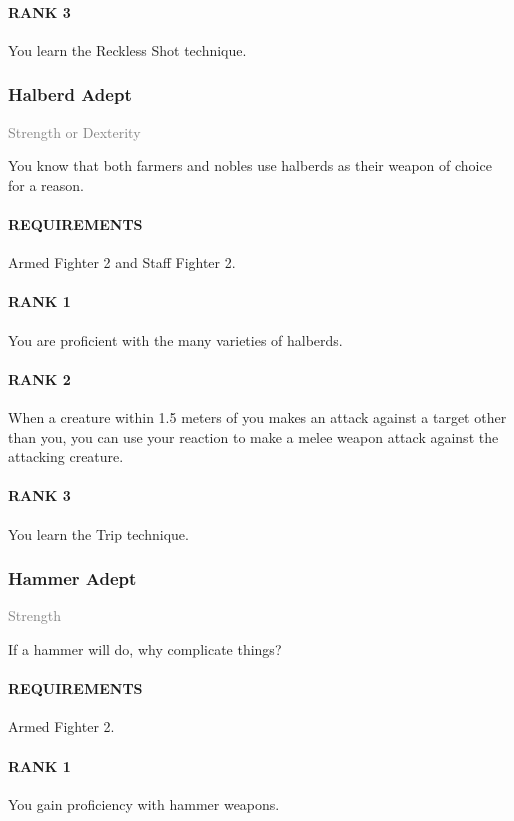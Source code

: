 \paragraph{RANK 3} You learn the Reckless Shot technique.

\subsubsection{Halberd Adept} \label{feat::halberdadept}
\small{\textcolor{gray}{Strength or Dexterity}}

\normalsize
You know that both farmers and nobles use halberds as their weapon of choice for a reason.
\paragraph{REQUIREMENTS} Armed Fighter 2 and Staff Fighter 2.
\paragraph{RANK 1} You are proficient with the many varieties of halberds.
\paragraph{RANK 2} When a creature within 1.5 meters of you makes an attack against a target other than you, you can use your reaction to make a melee weapon attack against the attacking creature.
\paragraph{RANK 3} You learn the Trip technique.

\subsubsection{Hammer Adept} \label{feat::hammeradept}
\small{\textcolor{gray}{Strength}}

\normalsize
If a hammer will do, why complicate things?
\paragraph{REQUIREMENTS} Armed Fighter 2.
\paragraph{RANK 1} You gain proficiency with hammer weapons.
